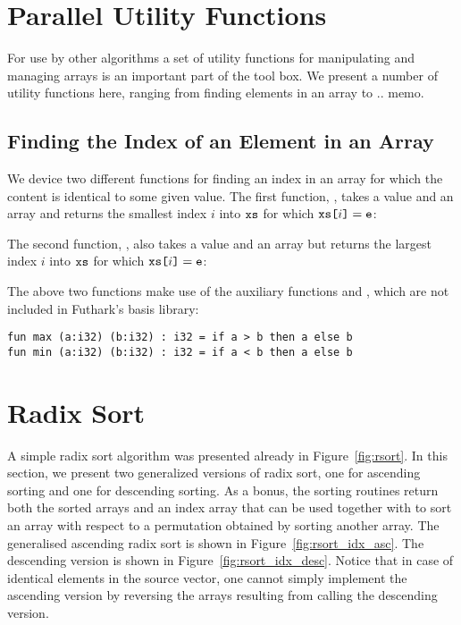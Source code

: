 \documentclass[oneside,11pt]{book}
\newenvironment{wrap}{\vspace{\topskip}\par\noindent\begin{minipage}{\linewidth}}{\end{minipage}\par}
\begin{document}
\begin{wrap}

\end{wrap}



\section{Parallel Utility Functions}
For use by other algorithms a set of utility functions for
manipulating and managing arrays is an important part of the tool
box. We present a number of utility functions here, ranging from
finding elements in an array to .. memo.

\subsection{Finding the Index of an Element in an Array}
We device two different functions for finding an index in an array for
which the content is identical to some given value. The first function,
, takes a value  and an array  and
returns the smallest index $i$ into $\texttt{xs}$ for which $\texttt{xs[}i\texttt{]} =
\texttt{e}$:

\begin{wrap}

\end{wrap}

The second function,
, also takes a value  and an array  but
returns the largest index $i$ into $\texttt{xs}$ for which $\texttt{xs[}i\texttt{]} =
\texttt{e}$:

\begin{wrap}

\end{wrap}

The above two functions make use of the auxiliary functions  and
, which are not included in Futhark's basis library:

\begin{lstlisting}
fun max (a:i32) (b:i32) : i32 = if a > b then a else b
fun min (a:i32) (b:i32) : i32 = if a < b then a else b
\end{lstlisting}


\section{Radix Sort}
A simple radix sort algorithm was presented already in
Figure~\ref{fig:rsort}. In this section, we present two generalized
versions of radix sort, one for ascending sorting and one for
descending sorting. As a bonus, the sorting routines return both the
sorted arrays and an index array that can be used together with
 to sort an array with respect to a permutation obtained by
sorting another array. The generalised ascending radix sort is shown
in Figure~\ref{fig:rsort_idx_asc}. The descending version is shown in
Figure~\ref{fig:rsort_idx_desc}. Notice that in case of identical
elements in the source vector, one cannot simply implement the
ascending version by reversing the arrays resulting from calling the
descending version.
\end{document}
